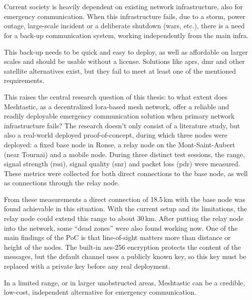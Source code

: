 
\chapter*{}

Current society is heavily dependent on existing network infrastructure, also for emergency communication.
When this infrastructure fails, due to a storm, power outage, large-scale incident or a deliberate shutdown (wars, etc.), there is a need for a back-up communication system, working independently from the main infra.

This back-up needs to be quick and easy to deploy, as well as affordable on larger scales and should be usable without a license.
Solutions like \gls{aprs}, \gls{dmr} and other satellite alternatives exist, but they fail to meet at least one of the mentioned requirements.

This raises the central research question of this thesis: to what extent does Meshtastic, as a decentralized \gls{lora}-based mesh network, offer a reliable and readily deployable emergency communication solution when primary network infrastructure fails?
The research doesn't only consist of a literature study, but also a real-world deployed proof-of-concept, during which three nodes were deployed: a fixed base node in Ronse, a relay node on the Mont-Saint-Aubert (near Tournai) and a mobile node.
During three distinct test sessions, the range, signal strength (\gls{rssi}), signal quality (\gls{snr}) and packet loss (\gls{pdr}) were measured.
These metrics were collected for both direct connections to the base node, as well as connections through the relay node.

From these measurements a direct connection of 18.5\,km with the base node was found achievable in this situation.
With the current setup and its limitations, the relay node could extend this range to about 30\,km.
After putting the relay node into the network, some ``dead zones'' were also found working now.
One of the main findings of the PoC is that line-of-sight matters more than distance or height of the nodes.
The built-in \gls{aes}-256 encryption protects the content of the messages, but the default channel uses a publicly known key, so this key must be replaced with a private key before any real deployment.

In a limited range, or in larger unobstructed areas, Meshtastic can be a credible, low-cost, independent alternative for emergency communication.